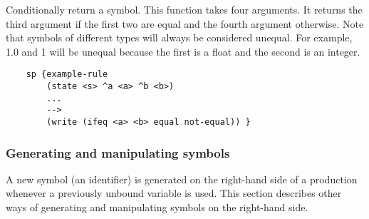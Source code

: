 \begin{description}
\item [\soarb{ifeq} --- ]
	Conditionally return a symbol. This function takes four arguments. It returns the third argument if the first two are equal and the fourth argument otherwise. Note that symbols of different types will always be considered unequal. For example, 1.0 and 1 will be unequal because the first is a float and the second is an integer.

	\begin{verbatim}
	sp {example-rule
	    (state <s> ^a <a> ^b <b>)
	    ...
	    -->
	    (write (ifeq <a> <b> equal not-equal)) }
	\end{verbatim}

\end{description}

\subdivider
\subsubsection*{Generating and manipulating symbols}

A new symbol (an identifier) is generated on the right-hand side of a production whenever a previously unbound variable is used. This section describes other ways of generating and manipulating symbols on the right-hand side.

